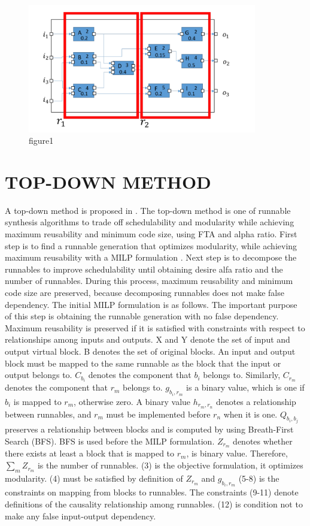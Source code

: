 \documentclass[conference,compsoc]{IEEEtran}
\begin{document}
\begin{figure}
	\centering
	\includegraphics[width=10cm,clip]{figure2.pdf}
	\caption{figure1}
	\label{fig9}
\end{figure}


\section{TOP-DOWN METHOD}
 A top-down method is proposed in \cite{Deng:2015:MSF:2735960.2735972}.
The top-down method is one of runnable synthesis algorithms to trade off schedulability and modularity while achieving maximum reusability and minimum code size, using FTA and alpha ratio. 
First step is to find a runnable generation that optimizes modularity, while achieving maximum reusability with a MILP formulation \cite{6871195}.
Next step is to decompose the runnables to improve schedulability until obtaining desire alfa ratio and the number of runnables.
During this process, maximum reusability and minimum code size are preserved, because decomposing runnables does not make false dependency.
 The initial MILP formulation is as follows.
The important purpose of this step is obtaining the runnable generation with no false dependency.
Maximum reusability is preserved if it is satisfied with constraints with respect to relationships among inputs and outputs.
X and Y denote the set of input and output virtual block.
B denotes the set of original blocks.
An input and output block must be mapped to the same runnable as the block that the input or output belongs to.
$C_{b_i}$ denotes the component that $b_i$ belongs to.
Similarly, $C_{r_m}$ denotes the component that $r_m$ belongs to.
$g_{b_i,r_m}$ is a binary value, which is one if $b_i$ is mapped to $r_m$, otherwise zero.
A binary value $h_{r_m,r_n}$ denotes a relationship between runnables, and $r_m$ must be implemented before $r_n$ when it is one.
$Q_{b_i,b_j}$ preserves a relationship between blocks and is computed by using Breath-First Search (BFS).
BFS is used before the MILP formulation.
$Z_{r_m}$ denotes whether there exists at least a block that is mapped to $r_m$, is binary value.
Therefore, $\sum_m Z_{r_m}$ is the number of runnables.
(3) is the objective formulation, it optimizes modularity.
(4) must be satisfied by definition of $Z_{r_m}$ and $g_{b_i,r_m}$
(5-8) is the constraints on mapping from blocks to runnables.
The constraints (9-11) denote definitions of the causality relationship among runnables.
(12) is condition not to make any false input-output dependency. 
\end{document}
